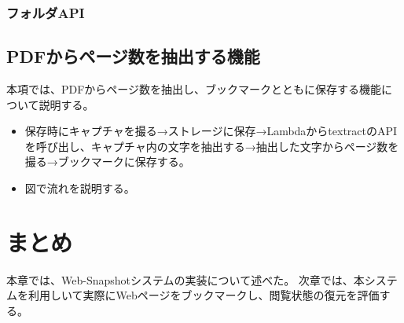 \subsubsection{フォルダAPI}

\subsection{PDFからページ数を抽出する機能}
本項では、PDFからページ数を抽出し、ブックマークとともに保存する機能について説明する。

\begin{itemize}
  \item 保存時にキャプチャを撮る→ストレージに保存→LambdaからtextractのAPIを呼び出し、キャプチャ内の文字を抽出する→抽出した文字からページ数を撮る→ブックマークに保存する。
  \item 図で流れを説明する。
\end{itemize}

\section{まとめ}
本章では、Web-Snapshotシステムの実装について述べた。
次章では、本システムを利用しいて実際にWebページをブックマークし、閲覧状態の復元を評価する。